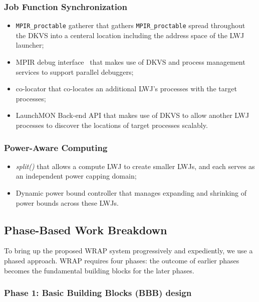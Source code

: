 \subsubsection{Job Function Synchronization}
\begin{itemize}
\item{{\tt MPIR\_proctable} gatherer that gathers {\tt MPIR\_proctable} spread throughout the
DKVS into a centeral location including the address space of the LWJ launcher;}
\item{MPIR debug interface~\cite{MPIRInterface} that makes use of DKVS and process
management services to support parallel debuggers;}
\item{co-locator that co-locates an additional LWJ's processes with
the target processes;}
\item{LaunchMON Back-end API that makes use of DKVS to allow another LWJ processes
to discover the locations of target processes scalably.}
\end{itemize}

\subsubsection{Power-Aware Computing}
\begin{itemize}
\item{{\em split()} that allows a compute LWJ to create smaller LWJs, and each serves as an independent power capping domain;}
\item{Dynamic power bound controller that manages expanding and shrinking of power bounds across these LWJs.}
\end{itemize}

\subsection{Phase-Based Work Breakdown}
To bring up the proposed WRAP system progressively and expediently, we use a phased approach.
WRAP requires four phases: the outcome of earlier phases becomes the fundamental 
building blocks for the later phases.

\subsubsection{Phase 1: Basic Building Blocks (BBB) design}

